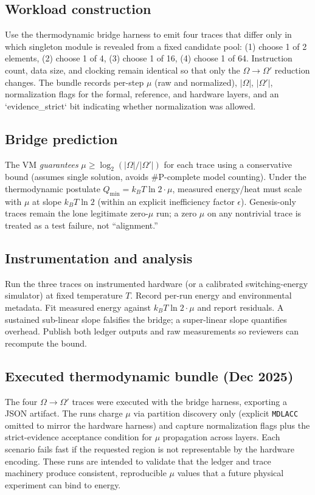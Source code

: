 \subsection{Workload construction}
Use the thermodynamic bridge harness to emit four traces that differ only in which singleton module is revealed from a fixed candidate pool: (1) choose 1 of 2 elements, (2) choose 1 of 4, (3) choose 1 of 16, (4) choose 1 of 64. Instruction count, data size, and clocking remain identical so that only the $\Omega \to \Omega'$ reduction changes. The bundle records per-step $\mu$ (raw and normalized), $|\Omega|$, $|\Omega'|$, normalization flags for the formal, reference, and hardware layers, and an `evidence\_strict` bit indicating whether normalization was allowed.

\subsection{Bridge prediction}
The VM \emph{guarantees} $\mu \ge \log_2(|\Omega|/|\Omega'|)$ for each trace using a conservative bound (assumes single solution, avoids \#P-complete model counting). Under the thermodynamic postulate $Q_{\min} = k_B T \ln 2 \cdot \mu$, measured energy/heat must scale with $\mu$ at slope $k_B T \ln 2$ (within an explicit inefficiency factor $\epsilon$). Genesis-only traces remain the lone legitimate zero-$\mu$ run; a zero $\mu$ on any nontrivial trace is treated as a test failure, not “alignment.”

\subsection{Instrumentation and analysis}
Run the three traces on instrumented hardware (or a calibrated switching-energy simulator) at fixed temperature $T$. Record per-run energy and environmental metadata. Fit measured energy against $k_B T \ln 2 \cdot \mu$ and report residuals. A sustained sub-linear slope falsifies the bridge; a super-linear slope quantifies overhead. Publish both ledger outputs and raw measurements so reviewers can recompute the bound.

\subsection{Executed thermodynamic bundle (Dec 2025)}
The four $\Omega \to \Omega'$ traces were executed with the bridge harness, exporting a JSON artifact. The runs charge $\mu$ via partition discovery only (explicit \texttt{MDLACC} omitted to mirror the hardware harness) and capture normalization flags plus the strict-evidence acceptance condition for $\mu$ propagation across layers. Each scenario fails fast if the requested region is not representable by the hardware encoding. These runs are intended to validate that the ledger and trace machinery produce consistent, reproducible $\mu$ values that a future physical experiment can bind to energy.

